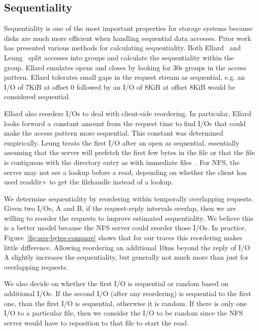 \subsection{Sequentiality}


Sequentiality is one of the most important properties for storage
systems because disks are much more efficient when handling sequential
data accesses.  Prior work has presented
various methods for calculating sequentiality.  Both
Ellard~\cite{EllardFast03} and Leung~\cite{LeungUsenix08} split accesses
into groups and calculate the sequentiality within the group.  Ellard
emulates opens and closes by looking for 30s groups in the access
pattern.  Ellard tolerates small gaps in the request stream as
sequential, e.g. an I/O of 7KiB at offset 0 followed by an I/O of 8KiB at
offset 8KiB would be considered sequential.  

Ellard also reorders I/Os
to deal with client-side reordering. In particular, Ellard looks
forward a constant amount from the request time to find I/Os that
could make the access pattern more sequential.  This constant was
determined empirically.  Leung treats the first I/O after an open as
sequential, essentially assuming that the server will prefetch the
first few bytes in the file or that the file is contiguous with the
directory entry as with immediate files~\cite{Mullender84ImmediateFiles}.  
For NFS, the server may not see a lookup before a read, depending on whether
the client has used readdir+ to get the filehandle instead of a lookup.

We determine sequentiality by reordering within temporally overlapping
requests. Given two I/Os, A and B, if the request-reply intervals
overlap, then we are willing to reorder the requests to improve
estimated sequentiality.  We believe this is a better model because
the NFS server could reorder those I/Os.  In practice,
Figure~\ref{fig:seq-bytes-compare} shows that for our traces this
reordering makes little difference.  Allowing reordering an additional
10ms beyond the reply of I/O A slightly increases the sequentiality,
but generally not much more than just for overlapping requests.

We also decide on whether the first I/O is sequential or random based
on additional I/Os.  If the second I/O (after any reordering) is
sequential to the first one, than the first I/O is sequential,
otherwise it is random.  If there is only one I/O to a particular
file, then we consider the I/O to be random since the NFS server would
have to reposition to that file to start the read.  

